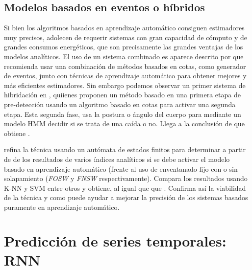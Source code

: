 \subsection{Modelos basados en eventos o híbridos}\label{sec:arte:modelos_hybridos}

Si bien los algoritmos basados en aprendizaje automático consiguen estimadores muy precisos, adolecen de requerir sistemas con gran capacidad de cómputo y de grandes consumos energéticos, que son precisamente las grandes ventajas de los modelos analíticos. El uso de un sistema combinado es aparece descrito por  que recomienda usar una combinación de métodos basados en cotas, como generador de eventos, junto con técnicas de aprendizaje automático para obtener mejores y más eficientes estimadores. Sin embargo podemos observar un primer sistema de hibridación en , quiienes proponen un método basado en una primera etapa de pre-detección usando un algoritmo basado en cotas para activar una segunda etapa. Esta segunda fase, usa la postura o ángulo del cuerpo para mediante un modelo HMM decidir si se trata de una caída o no. Llega a la conclusión de que obtiene .

 refina la técnica usando un autómata de estados finitos para determinar a partir de de los resultados de varios índices analíticos si se debe activar el modelo basado en aprendizaje automático (frente al uso de enventanado fijo con o sin solapamiento (\textit{FOSW} y \textit{FNSW} respectivamente). Compara los resultados usando K-NN y SVM entre otros y obtiene, al igual que  que . Confirma así la viabilidad de la técnica y como puede ayudar a mejorar la precisión de los sistemas basados puramente en aprendizaje automático.

\section{Predicción de series temporales: RNN}

